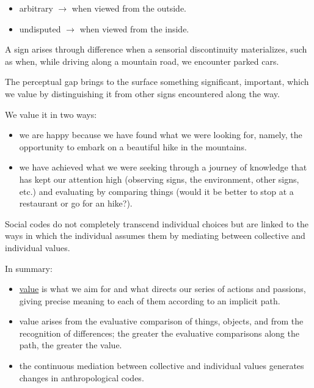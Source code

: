 \begin{itemize}
\tightlist
\item arbitrary \(\rightarrow\) when viewed from the outside.
\item undisputed \(\rightarrow\) when viewed from the inside.
\end{itemize}

A sign arises through difference when a sensorial discontinuity materializes, such as when, while driving along a mountain road, we encounter parked cars.

The perceptual gap brings to the surface something significant, important, which we value by distinguishing it from other signs encountered along the way.

We value it in two ways:

\begin{itemize}
\tightlist
\item we are happy because we have found what we were looking for, namely, the opportunity to embark on a beautiful hike in the mountains.
\item we have achieved what we were seeking through a journey of knowledge that has kept our attention high (observing signs, the environment, other signs, etc.) and evaluating by comparing things (would it be better to stop at a restaurant or go for an hike?).
\end{itemize}

Social codes do not completely transcend individual choices but are linked to the ways in which the individual assumes them by mediating between collective and individual values.

In summary:

\begin{itemize}
\tightlist
\item \href{https://github.com/musicaecodice/EMC/blob/main/1_premises/suoni/sordi1.mp4}{value} is what we aim for and what directs our series of actions and passions, giving precise meaning to each of them according to an implicit path.
\item value arises from the evaluative comparison of things, objects, and from the recognition of differences; the greater the evaluative comparisons along the path, the greater the value.
\item the continuous mediation between collective and individual values \hspace{0pt}\hspace{0pt}generates changes in anthropological codes.
\end{itemize}

